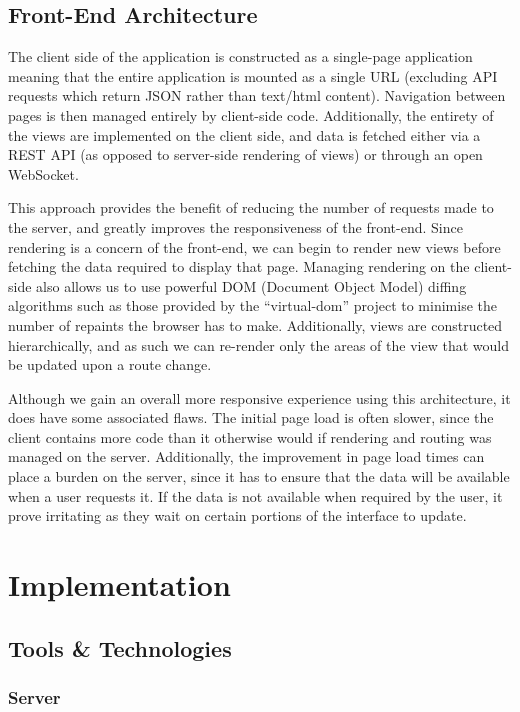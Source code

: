 \documentclass{l4proj}
\begin{document}
        
    \section{Front-End Architecture}
    The client side of the application is constructed as a single-page application meaning that the entire application is mounted as a single URL (excluding API requests which return JSON rather than text/html content). Navigation between pages is then managed entirely by client-side code. Additionally, the entirety of the views are implemented on the client side, and data is fetched either via a REST API (as opposed to server-side rendering of views) or through an open WebSocket. 

This approach provides the benefit of reducing the number of requests made to the server, and greatly improves the responsiveness of the front-end. Since rendering is a concern of the front-end, we can begin to render new views before fetching the data required to display that page. Managing rendering on the client-side also allows us to use powerful DOM (Document Object Model) diffing algorithms such as those provided by the ``virtual-dom'' project to minimise the number of repaints the browser has to make. Additionally, views are constructed hierarchically, and as such we can re-render only the areas of the view that would be updated upon a route change.

Although we gain an overall more responsive experience using this architecture, it does have some associated flaws. The initial page load is often slower, since the client contains more code than it otherwise would if rendering and routing was managed on the server. Additionally, the improvement in page load times can place a burden on the server, since it has to ensure that the data will be available when a user requests it. If the data is not available when required by the user, it prove irritating as they wait on certain portions of the interface to update.


\chapter{Implementation}

\section{Tools \& Technologies}
    \subsection{Server}
\end{document}

